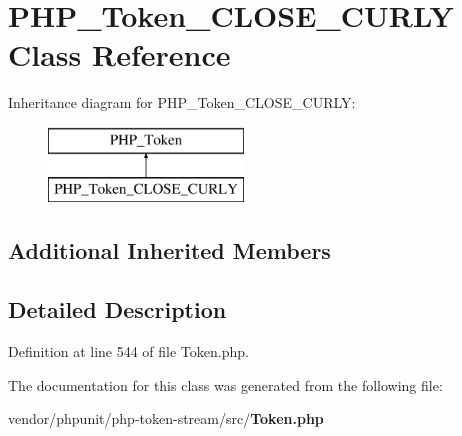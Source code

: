 \section{P\+H\+P\+\_\+\+Token\+\_\+\+C\+L\+O\+S\+E\+\_\+\+C\+U\+R\+L\+Y Class Reference}
\label{class_p_h_p___token___c_l_o_s_e___c_u_r_l_y}
Inheritance diagram for P\+H\+P\+\_\+\+Token\+\_\+\+C\+L\+O\+S\+E\+\_\+\+C\+U\+R\+L\+Y\+:\begin{figure}[H]
\begin{center}
\leavevmode
\includegraphics[height=2.000000cm]{class_p_h_p___token___c_l_o_s_e___c_u_r_l_y}
\end{center}
\end{figure}
\subsection*{Additional Inherited Members}


\subsection{Detailed Description}


Definition at line 544 of file Token.\+php.



The documentation for this class was generated from the following file\+:\begin{DoxyCompactItemize}
\item 
vendor/phpunit/php-\/token-\/stream/src/{\bf Token.\+php}\end{DoxyCompactItemize}
